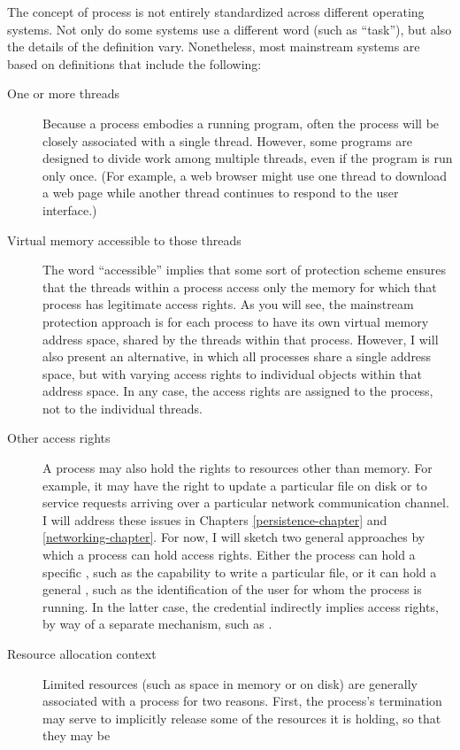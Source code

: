 The concept of process is not entirely standardized across different
operating systems.  Not only do some systems use a different word (such as
``task''), but also the details of the definition vary.  Nonetheless,
most mainstream systems are based on definitions that include
the following:
\begin{description}
\item[One or more threads] Because a process embodies a running
program, often the process will be closely associated with a single
thread.  However, some programs are designed to divide work among
multiple threads, even if the program is run only once.  (For example,
a web browser might use one thread to download a web page while
another thread continues to respond to the user interface.)
\item[Virtual memory accessible to those threads] The word
``accessible'' implies that some sort of protection scheme ensures
that the threads within a process access only the memory for which that
process has legitimate access rights.  As you will see, the mainstream
protection approach is for each process to have its own virtual memory
address space, shared by the threads within that process.  However, I will also present an alternative, in which
all processes share a single address space, but with varying access rights to
individual objects within that address space.  In any case, the access
rights are assigned to the process, not to the individual threads.
\item[Other access rights]A process may also hold the rights to
resources other than memory.  For example, it may have the right to
update a particular file on disk or to service requests arriving over a
particular network communication channel.  I will address these
issues in Chapters \ref{persistence-chapter} and \ref{networking-chapter}.  For now, I will sketch two
general approaches by which a process can hold access
rights.  Either the process can hold a specific ,
such as the capability to write a particular file, or it can hold a
general , such as the identification of the user for
whom the process is running.  In the latter case, the credential
indirectly implies access rights, by way of a separate mechanism, such
as .
\item[Resource allocation context] Limited resources (such as space in
memory or on disk) are generally associated with a process for two
reasons.  First, the process's termination may serve to implicitly
release some of the resources it is holding, so that they may be

\end{description}
